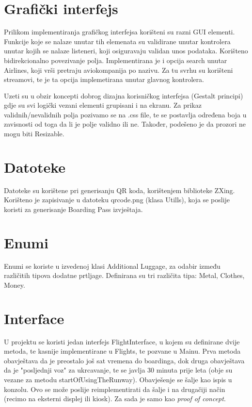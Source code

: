 \section{Grafički interfejs}

Prilikom implementiranja grafičkog interfejsa korišteni su razni GUI elementi. Funkcije koje se nalaze unutar tih elemenata su validirane unutar kontrolera unutar kojih se nalaze listeneri, koji osiguravaju validan unos podataka. Korišteno bidirekcionalno povezivanje polja. Implementirana je i opcija search unutar Airlines, koji vrši pretraju aviokompanija po nazivu. Za tu svrhu su korišteni streamovi, te je ta opcija implemetirana unutar glavnog kontrolera.

Uzeti su u obzir koncepti dobrog dizajna korisničkog interfejsa (Gestalt principi) gdje su svi logički vezani elementi grupisani i na ekranu. 
Za prikaz validnih/nevalidnih polja pozivamo se na .css file, te se postavlja određena boja u zavisnosti od toga da li je polje validno ili ne. Također, podešeno je da prozori ne mogu biti Resizable.

\section{Datoteke}

Datoteke su korištene pri generisanju QR koda, korištenjem biblioteke ZXing. Korišteno je zapisivanje u datoteku qrcode.png (klasa Utills), koja se poslije koristi za generisanje Boarding Pass izvještaja.

\section{Enumi}

Enumi se koriste u izvedenoj klasi Additional Luggage, za odabir između različitih tipova dodatne prtljage. Definirana su tri različita tipa: Metal, Clothes, Money.

\section{Interface}

U projektu se koristi jedan interfejs FlightInterface, u kojem su definirane dvije metoda, te kasnije implementirane u Flights, te pozvane u Mainu. Prva metoda obavještava da je preostalo još sat vremena do boardinga, dok druga obavještava da je "posljednji voz" za ukrcavanje, te se javlja 30 minuta prije leta (obje su vezane za metodu startOfUsingTheRunway). Obavješenje se šalje kao ispis u konzolu. Ovo se može poslije reimplementirati da šalje i na drugačiji način (recimo na eksterni displej ili kiosk). Za sada je samo kao \textit{proof of concept}.

